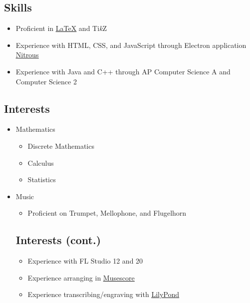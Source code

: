 \documentclass[12pt, twocolumn]{article}
\begin{document}
{			\subsection*{Skills}
				\begin{itemize}
					\item
						Proficient in \href{https://github.com/Endolite/TeX}{\underline{\LaTeX}} and Ti\textit{k}Z
					\item
						Experience with HTML, CSS, and JavaScript through Electron application \href{https://github.com/Endolite/Nitrous}{\underline{Nitrous}}
					\item
						Experience with Java and C++ through AP Computer Science A and Computer Science 2
				\end{itemize}
			\subsection*{Interests}
				\begin{itemize}
					\item
						Mathematics
						\begin{itemize}[leftmargin = 13.5pt]
							\item
								Discrete Mathematics
							\item
								Calculus
							\item
								Statistics
						\end{itemize}
					\item
						Music
					\begin{itemize}[leftmargin = 13.5pt]
						\item
							Proficient on Trumpet, Mellophone, and Flugelhorn
					\end{itemize}
				\subsection*{Interests (cont.)}
					\begin{itemize}[leftmargin = 13.5pt]
						\item
							Experience with FL Studio 12 and 20
						\item
							Experience arranging in \href{https://musescore.com/user/31144332/scores/7683791/s/-ez0DL?share=copy_link}{\underline{Musescore}}
						\item
							Experience transcribing/engraving with \href{https://github.com/Endolite/LilyPond}{\underline{LilyPond}}
					\end{itemize}
				\end{itemize}
	}
\end{document}
